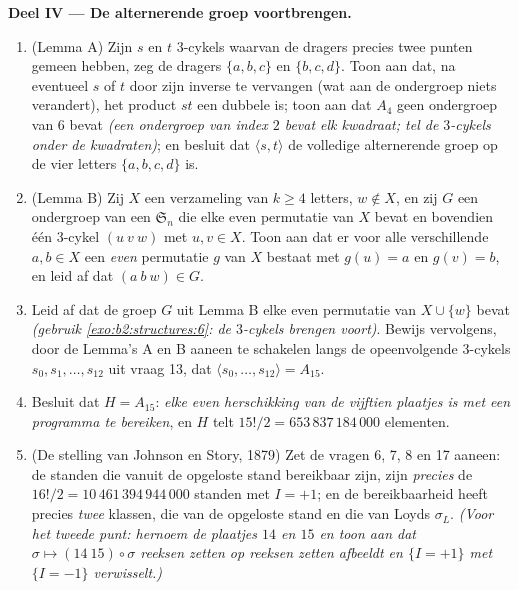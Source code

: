 \begin{problem}
\medskip
\noindent\textbf{Deel IV --- De alternerende groep voortbrengen.}
\begin{enumerate}[resume]
  \item (Lemma A) Zijn $s$ en $t$ $3$-cykels waarvan de dragers
        precies twee punten gemeen hebben, zeg de dragers $\{a, b,
        c\}$ en $\{b, c, d\}$. Toon aan dat, na eventueel $s$ of
        $t$ door zijn inverse te vervangen (wat aan de
         ondergroep niets verandert), het product
        $st$ een dubbele  is; toon aan dat $A_4$ geen
        ondergroep van  $6$ bevat \emph{(een ondergroep van
        index $2$ bevat elk kwadraat; tel de $3$-cykels onder de
        kwadraten)}; en besluit dat $\langle s, t\rangle$ de
        volledige alternerende groep op de vier letters $\{a, b,
        c, d\}$ is.
  \item (Lemma B) Zij $X$ een verzameling van $k \geq 4$ letters,
        $w \notin X$, en zij $G$ een ondergroep van een
        $\mathfrak{S}_n$ die elke even permutatie van $X$ bevat en
        bovendien één $3$-cykel $(u\ v\ w)$ met $u, v \in X$. Toon
        aan dat er voor alle verschillende $a, b \in X$ een
        \emph{even} permutatie $g$ van $X$ bestaat met $g(u) = a$
        en $g(v) = b$, en leid af dat $(a\ b\ w) \in G$.
  \item Leid af dat de groep $G$ uit Lemma B elke even permutatie
        van $X \cup \{w\}$ bevat \emph{(gebruik
        \cref{exo:b2:structures:6}: de $3$-cykels brengen voort)}.
        Bewijs vervolgens, door de Lemma's A en B aaneen te
        schakelen langs de opeenvolgende $3$-cykels $s_0, s_1,
        \dots, s_{12}$ uit vraag 13, dat $\langle s_0, \dots,
        s_{12}\rangle = A_{15}$.
  \item Besluit dat $H = A_{15}$: \emph{elke even herschikking van
        de vijftien plaatjes is met een programma te bereiken}, en
        $H$ telt $15!/2 = 653\,837\,184\,000$ elementen.
  \item (De stelling van Johnson en Story, 1879) Zet de vragen 6,
        7, 8 en 17 aaneen: de standen die vanuit de opgeloste
        stand bereikbaar zijn, zijn \emph{precies} de $16!/2 =
        10\,461\,394\,944\,000$ standen met $I = +1$; en de
        bereikbaarheid heeft precies \emph{twee} klassen, die van
        de opgeloste stand en die van Loyds $\sigma_L$. \emph{(Voor
        het tweede punt: hernoem de plaatjes $14$ en $15$ en toon
        aan dat $\sigma \mapsto (14\ 15) \circ \sigma$ reeksen
        zetten op reeksen zetten afbeeldt en $\{I = +1\}$ met $\{I
        = -1\}$ verwisselt.)}
\end{enumerate}


\end{problem}
